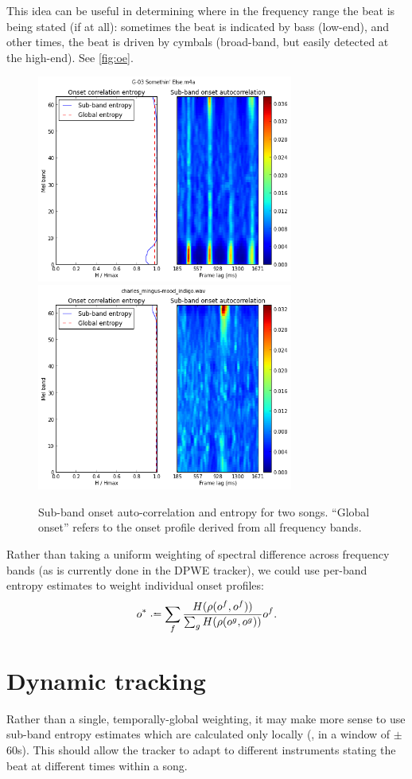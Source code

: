 \documentclass{article}
\begin{document}
This idea can be useful in determining where in the frequency range the beat is being stated (if at all): sometimes the beat is indicated by bass (low-end), and other times, the beat is driven
by cymbals (broad-band, but easily detected at the high-end).  See \autoref{fig:oe}. 

\begin{figure}
\centering%
\includegraphics[width=0.75\textwidth]{oe-bass}\\
\includegraphics[width=0.75\textwidth]{oe-treble}%
\caption{Sub-band onset auto-correlation and entropy for two songs.  ``Global onset'' refers to the onset profile derived from all frequency bands.\label{fig:oe}}
\end{figure}

Rather than taking a uniform weighting of spectral difference across frequency bands (as is currently done in the DPWE tracker),
we could use per-band entropy estimates to weight individual onset profiles:
\[
o^* \defeq \sum_f \frac{H(\rho(o^f, o^f))}{\sum_g H(\rho(o^g, o^g))} o^f.
\]

\section{Dynamic tracking}
Rather than a single, temporally-global weighting, it may make more sense to use sub-band entropy estimates which are calculated only locally (\eg, in a window of $\pm$60s).  This should allow
the tracker to adapt to different instruments stating the beat at different times within a song.
\end{document}
